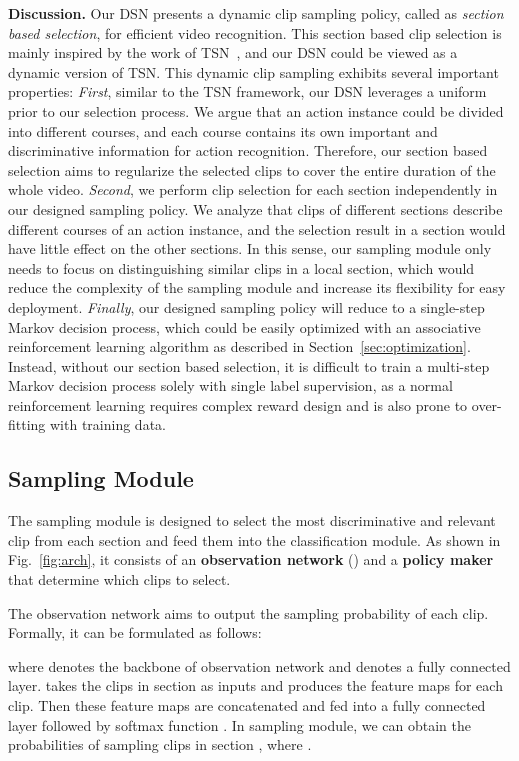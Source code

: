 \documentclass[journal]{IEEEtran}
\begin{document}
{\bf Discussion.} Our DSN presents a dynamic clip sampling policy, called as {\em section based selection}, for efficient video recognition. This section based clip selection is mainly inspired by the work of TSN~\cite{TSN-J}, and our DSN could be viewed as a dynamic version of TSN. This dynamic clip sampling exhibits several important properties: {\em First}, similar to the TSN framework, our DSN leverages a uniform prior to our selection process. We argue that an action instance could be divided into different courses, and each course contains its own important and discriminative information for action recognition. Therefore, our section based selection aims to regularize the selected clips to cover the entire duration of the whole video. {\em Second}, we perform clip selection for each section independently in our designed sampling policy. We analyze that clips of different sections describe different courses of an action instance, and the selection result in a section would have little effect on the other sections. In this sense, our sampling module only needs to focus on distinguishing similar clips in a local section, which would reduce the complexity of the sampling module and increase its flexibility for easy deployment. {\em Finally}, our designed sampling policy will reduce to a single-step Markov decision process, which could be easily optimized with an associative reinforcement learning algorithm as described in Section~\ref{sec:optimization}. Instead, without our section based selection, it is difficult to train a multi-step Markov decision process solely with single label supervision, as a normal reinforcement learning requires complex reward design and is also prone to over-fitting with training data.
\subsection{Sampling Module}
\label{sec:sampling}

The sampling module is designed to select the most discriminative and relevant clip from each section and feed them into the classification module.
As shown in Fig.~\ref{fig:arch}, it consists of an {\bf observation network} () and a {\bf policy maker} that determine which clips to select.

The observation network aims to output the sampling probability of each clip.
Formally, it can be formulated as follows:

where  denotes the backbone of observation network and  denotes a fully connected layer.
 takes the clips  in section  as inputs and produces the feature maps for each clip.
Then these feature maps are concatenated and fed into a fully connected layer  followed by softmax function .
In sampling module, we can obtain the probabilities  of sampling clips  in section , where .
\end{document}
